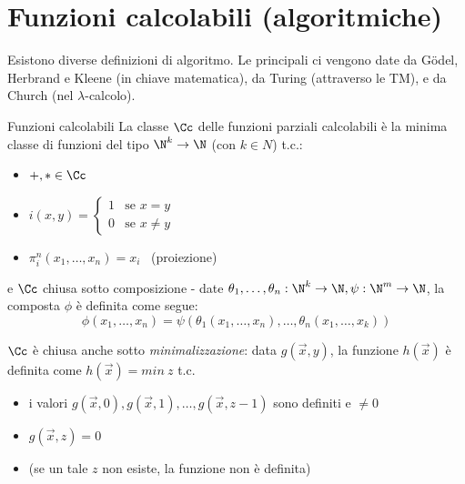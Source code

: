 \documentclass[a4paper,11pt]{report}
\begin{document}
\section{Funzioni calcolabili (algoritmiche)}
Esistono diverse definizioni di algoritmo. Le principali ci vengono date da Gödel, Herbrand e Kleene (in chiave matematica), da Turing (attraverso le TM), e da Church (nel \( \lambda \)-calcolo).

\begin{defframe}{Funzioni calcolabili}{}
    La classe \( \Cc \) delle funzioni parziali calcolabili è la minima classe di funzioni del tipo \( \N^k \to \N \) (con \( k\in N \)) t.c.:
    \begin{itemize}
        \item \( +, * \in \Cc \)
        \item \( i(x, y) = \begin{cases}
                1 & \text{se } x = y\\
                0 & \text{se } x \neq y
        \end{cases} \)
    \item \( \pi_i^n (x_1, \dots, x_n) = x_i \) \ {\color{CadetBlue}(proiezione)}
    \end{itemize}
    e \( \Cc \) chiusa sotto composizione -
    date \( \theta_1, \dots, \theta_n: \N^k \to \N, \psi:\N^m \to \N \), la composta \( \phi \) è definita come segue:
    \[ \phi(x_1, \dots, x_n) = \psi(\theta_1(x_1, \dots, x_n), \dots, \theta_n(x_1, \dots, x_k)) \]

    \( \Cc \) è chiusa anche sotto \textit{minimalizzazione}:
    data \( g(\vec{x}, y)\), la funzione \( h(\vec{x}) \) è definita come \( h(\vec{x}) = min \ z\) t.c. 
\begin{itemize}
    \item i valori \( g(\vec{x}, 0 ), g(\vec{x}, 1), \dots, g(\vec{x}, z-1)\) sono definiti e \( \neq 0 \)
    \item \(g(\vec{x}, z ) = 0 \)
    \item (se un tale \( z \) non esiste, la funzione non è definita)
\end{itemize}

\end{defframe}
\end{document}
